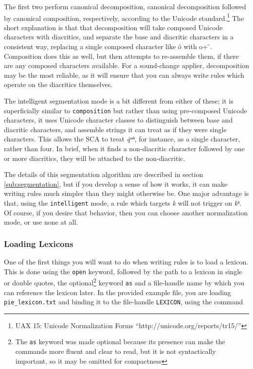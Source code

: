 \documentclass[10pt,letterpaper]{article}
\begin{document}
The first two perform canonical decomposition, canonical decomposition followed by canonical composition, respectively, according to the Unicode standard.\footnote{UAX 15: Unicode Normalization Forms ``http://unicode.org/reports/tr15/''} The short explanation is that that decomposition will take composed Unicode characters with diacritics, and separate the base and diacritic characters in a consistent way, replacing a single composed character like ö with o+ ̈. Composition does this as well, but then attempts to re-assemble them, if there are any composed characters available. For a sound-change applier, decomposition may be the most reliable, as it will ensure that you can always write rules which operate on the diacritics themselves.


The intelligent segmentation mode is a bit different from either of these; it is superficially similar to \texttt{composition} but rather than using pre-composed Unicode characters, it uses Unicode character classes to distinguish between base and diacritic characters, and assemble strings it can treat as if they were single characters. This allows the SCA to treat \emph{q̇ʷʰ}, for instance, as a single character, rather than four. In brief, when it finds a non-diacritic character followed by one or more diacritics, they will be attached to the non-diacritic.

The details of this segmentation algorithm are described in section \ref{sub:segmentation}, but if you develop a sense of how it works, it can make writing rules much simpler than they might otherwise be. One major advantage is that, using the \texttt{intelligent} mode, a rule which targets \emph{k} will not trigger on \emph{kʰ}. Of course, if you desire that behavior, then you can choose another normalization mode, or use none at all.


\subsubsection{Loading Lexicons}
\label{sub:loading_lexicons}
One of the first things you will want to do when writing rules is to load a lexicon. This is done using the \texttt{open} keyword, followed by the path to a lexicon in single or double quotes, the optional\footnote{The \texttt{as} keyword was made optional because its presence can make the commands more fluent and clear to read, but it is not syntactically important, so it may be omitted for compactness} keyword \texttt{as} and a file-handle name by which you can reference the lexicon later. In the provided example file, you are loading \texttt{pie\_lexicon.txt} and binding it to the file-handle \texttt{LEXICON}, using the command
\end{document}
